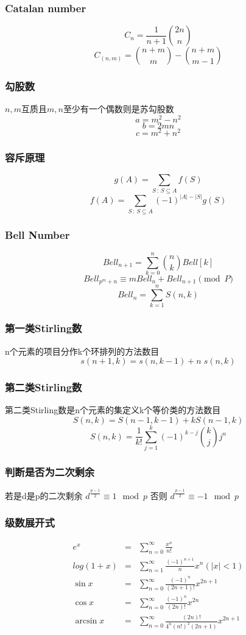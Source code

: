 \subsubsection{Catalan number}
\[ C_n = \frac{1}{n+1}{2n \choose n} \]
\[ C_{(n,m)} = {n+m \choose m} - {n+m \choose m-1} \]
\subsubsection{勾股数}
$n, m$互质且$m,n$至少有一个偶数则是苏勾股数
\[ a = m^2-n^2 \]
\[ b = 2mn \]
\[ c = m^2+n^2 \]
\subsubsection{容斥原理}
\[ g(A)=\sum_{S\,:\,S\subseteq A}f(S) \]
\[ f(A)=\sum_{S\,:\,S\subseteq A}(-1)^{\left|A\right|-\left|S\right|}g(S) \]
\subsubsection{Bell Number}
\[Bell_{n+1} = \sum\limits_{k=0}^n {n\choose k} Bell[k] \]
\[Bell_{p^m+n} \equiv mBell_{n} + Bell_{n+1} \pmod P\]
\[Bell_n = \sum\limits_{k=1}^{n} S(n,k) \]
\subsubsection{第一类Stirling数}
n个元素的项目分作k个环排列的方法数目
\[s(n+1,k)=s(n,k-1) + n \; s(n,k) \]
\subsubsection{第二类Stirling数}
第二类Stirling数是n个元素的集定义k个等价类的方法数目
\[S(n,k) = S(n-1,k-1) + k S(n-1,k)\]
\[S(n,k) =\frac{1}{k!}\sum_{j=1}^{k}(-1)^{k-j} {k\choose j} j^n \]
\subsubsection{判断是否为二次剩余}
若是d是p的二次剩余 $ d^{\frac{p-1}{2}} \equiv 1 \mod p $
否则 $ d^{\frac{p-1}{2}} \equiv -1 \mod p $
\subsubsection{级数展开式}
\begin{eqnarray*}
	e^x &=& \sum\limits_{n=0}^{\infty} \frac{x^n}{n!} \\
	log(1+x) &=& \sum\limits_{n=1}^{\infty} \frac{(-1)^{n+1}}{n}x^n (|x| < 1) \\
	\sin x &=& \sum\limits_{n=0}^{\infty} \frac{(-1)^n}{(2n+1)!}x^{2n+1} \\
	\cos x &=& \sum\limits_{n=0}^{\infty} \frac{(-1)^n}{(2n)!}x^{2n} \\
	\arcsin x &=& \sum\limits_{n=0}^{\infty} \frac{(2n)!}{4^n(n!)^2(2n+1)} x^{2n+1}
\end{eqnarray*} 
